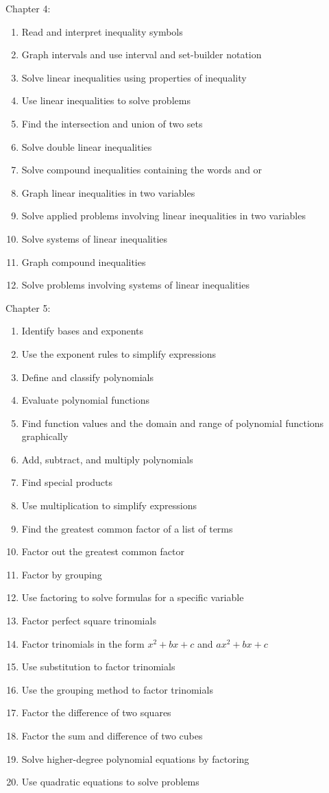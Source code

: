 \documentclass[11pt]{article}
\newenvironment{alphalist}{
  \begin{enumerate}[(1)]
    \addtolength{\itemsep}{-1.0\itemsep}}
  {\end{enumerate}}
\begin{document}
\noindent Chapter 4:
\begin{alphalist}
    \item Read and interpret inequality symbols
    \item Graph intervals and use interval and set-builder notation
    \item Solve linear inequalities using properties of inequality
    \item Use linear inequalities to solve problems
    \item Find the intersection and union of two sets
    \item Solve double linear inequalities
    \item Solve compound inequalities containing the words and or
    \item Graph linear inequalities in two variables
    \item Solve applied problems involving linear inequalities in two variables
    \item Solve systems of linear inequalities
    \item Graph compound inequalities
    \item Solve problems involving systems of linear inequalities
\end{alphalist}
\noindent Chapter 5:
\begin{alphalist}
    \item Identify bases and exponents
    \item Use the exponent rules to simplify expressions
    \item Define and classify polynomials
    \item Evaluate polynomial functions
    \item Find function values and the domain and range of polynomial functions graphically
    \item Add, subtract, and multiply polynomials
    \item Find special products
    \item Use multiplication to simplify expressions
    \item Find the greatest common factor of a list of terms
    \item Factor out the greatest common factor
    \item Factor by grouping
    \item Use factoring to solve formulas for a specific variable
    \item Factor perfect square trinomials
    \item Factor trinomials in the form $x^2 + bx + c$ and $ax^2 + bx + c$
    \item Use substitution to factor trinomials
    \item Use the grouping method to factor trinomials
    \item Factor the difference of two squares
    \item Factor the sum and difference of two cubes
    \item Solve higher-degree polynomial equations by factoring
    \item Use quadratic equations to solve problems
\end{alphalist}
 
\end{document}
